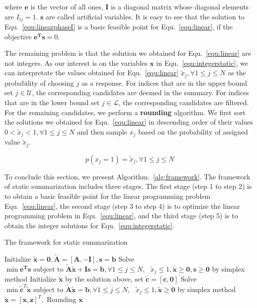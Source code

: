 \documentclass[runningheads]{llncs}
\begin{document}
where $\mathbf{e}$ is the vector of all ones, $\mathbf{I}$ is a diagonal matrix whose diagonal elements are $I_{ij}=1$. $\mathbf{s}$ are called artificial variables. It is easy to see that the solution to Equ.~\ref{equ:linearphaseI} is a basic feasible point for Equ.~\ref{equ:linear}, if the objective $\mathbf{e^{T}s}=0 $.

The remaining problem is that the solution we obtained for Equ.~\ref{equ:linear} are not integers. As our interest is on the variables $\mathbf{x}$ in Equ.~\ref{equ:integerstatic}, we can interpretate the values obtained for Equ.~\ref{equ:linear} $\tilde{x}_j, \forall 1\leq j\leq N $ as the probability of choosing $j$ as a response. For indices that are in the upper bound set $j \in \mathcal{U}$, the corresponding candidates are deemed in the summary. For indices that are in the lower bound set $j \in \mathcal{L}$, the corresponding candidates are filtered. For the remaining candidates, we perform a \textbf{rounding} algorithm. We first sort the solutions we obtained for Equ.~\ref{equ:linear} in descending order of their values $0< \tilde{x}_j< 1,\forall 1\leq j\leq N$ and then sample $x_j$ based on the probability of assigned value $\tilde{x}_j$.

\vspace{-0.3cm}
\begin{equation}
p(x_j=1)= \tilde{x}_j, \forall 1\leq j \leq N
\end{equation}
\vspace{-0.6cm}

To conclude this section, we present Algorithm.~\ref{alg:framework}. The framework of static summarization includes three stages. The first stage (step 1 to step 2) is to obtain a basic feasible point for the linear programming problem Equ.~\ref{equ:linear}, the second stage (step 3 to step 4) is to optimize the linear programming problem in Equ.~\ref{equ:linear}, and the third stage (step 5) is to obtain the integer solutions for Equ.~\ref{equ:integerstatic}.

\vspace{-0.6cm}
\begin{algorithm}\label{alg:framework}
\caption{The framework for static summarization}

Initialize $\tilde{\mathbf{x}}=\mathbf{0},\tilde{\mathbf{A}}=[\mathbf{A},-\mathbf{I}],\mathbf{s}=\mathbf{b}$\;
Solve $\min \mathbf{e^{T}s} \textrm{ subject to } \tilde{\mathbf{A}}\tilde{\mathbf{x}} + \mathbf{Is} = \mathbf{b},  \forall 1\leq j\leq N,\textrm{ } \tilde{x}_j \leq 1, \tilde{\mathbf{x}}\geq \mathbf{0}, \mathbf{s}\geq \mathbf{0}$ by simplex method\;
Initialize $\tilde{\mathbf{x}}$ by the solution above, set $\tilde{\mathbf{c}}=[\mathbf{c},\mathbf{0}]$  \;
Solve $\min \tilde{\mathbf{c}}^T \tilde{\mathbf{x}}\textrm{ subject to } \tilde{\mathbf{A}}\tilde{\mathbf{x}} = \mathbf{b}, \forall 1\leq j\leq N,\textrm{ } \tilde{x}_j \leq 1, \tilde{\mathbf{x}}\geq \mathbf{0}$ by simplex method\;
$\tilde{\mathbf{x}}=[\mathbf{x},\mathbf{z}]^T,$ Rounding $\mathbf{x}$\;
\end{algorithm}
\vspace{-0.8cm}
\end{document}
